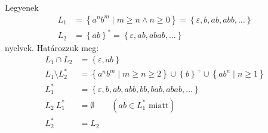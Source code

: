 \documentclass[a4paper,12pt]{article}
\theoremstyle{definition}
\begin{document}
	\subsubsection{}
	Legyenek
	\begin{align*}
		L_1 &= \left\lbrace a^nb^m \; | \; m \ge n \land n \ge 0 \right\rbrace = \left\lbrace \varepsilon, b, ab, abb, \dots \right\rbrace  \\
		L_2 &= \left\lbrace ab \right\rbrace^* = \left\lbrace \varepsilon, ab, abab, \dots \right\rbrace 
	\end{align*}
	nyelvek. Határozzuk meg:
	\begin{align*}
		L_1 \cap L_2 &= \left\lbrace \varepsilon, ab \right\rbrace \\
		L_1 \setminus L_2^* &= \left\lbrace a^nb^m \; | \; m \ge n \ge 2 \right\rbrace \cup \left\lbrace b \right\rbrace^+ \cup \left\lbrace ab^n \; | \; n \ge 1 \right\rbrace \\
		L_1^* &= \left\lbrace \varepsilon, b, ab, abb, bb, bab, abab, \dots \right\rbrace \\
		L_2 \ L_1^* &= \emptyset \qquad (ab \in L_1^* \text{ miatt}) \\
		L_2^* &= L_2
	\end{align*}
	

		
	
\end{document}
